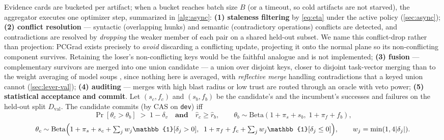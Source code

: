 \documentclass{article}
\newcommand{\code}[1]{\texttt{#1}}
\newcommand{\Dval}{D_{\mathrm{val}}}
\begin{document}
Evidence cards are bucketed per artifact; when a bucket reaches batch size $B$ (or a timeout, so cold artifacts are not starved), the aggregator executes one optimizer step, summarized in \cref{alg:async}: \textbf{(1) staleness filtering} by \cref{eq:eta} under the active policy (\cref{sec:async}); \textbf{(2) conflict resolution} --- syntactic (overlapping hunks) and semantic (contradictory operations) conflicts are detected, and contradictions are resolved by \emph{dropping} the weaker member of each pair on a shared held-out subset. We name this conflict-drop rather than projection: PCGrad \citep{yu2020pcgrad} exists precisely to \emph{avoid} discarding a conflicting update, projecting it onto the normal plane so its non-conflicting component survives. Retaining the loser's non-conflicting keys would be the faithful analogue and is not implemented; \textbf{(3) fusion} --- complementary survivors are merged into one union candidate --- a union over disjoint keys, closer to disjoint task-vector merging than to the weight averaging of model soups \citep{wortsman2022modelsoups}, since nothing here is averaged, with \emph{reflective merge} handling contradictions that a keyed union cannot (\cref{sec:lever-val}); \textbf{(4) auditing} --- merges with high blast radius or low trust are routed through an oracle with veto power; \textbf{(5) statistical acceptance and commit}. Let $(s_c, f_c)$ and $(s_b, f_b)$ be the candidate's and the incumbent's successes and failures on the held-out split $\Dval$. The candidate commits (by CAS on \code{dev}) iff
\begin{equation}
\label{eq:accept}
\Pr\!\left[\theta_c > \theta_b\right] \;>\; 1 - \delta_v
\quad\textbf{and}\quad \hat r_c \ge \hat r_b,
\qquad
\theta_b \sim \mathrm{Beta}(1 + \pi_s + s_b,\; 1 + \pi_f + f_b),
\end{equation}
\begin{equation}
\label{eq:acceptcand}
\theta_c \sim \mathrm{Beta}\Bigl(1 + \pi_s + s_c + \textstyle\sum_j w_j \mathbb{1}[\delta_j > 0],\;\;
                                 1 + \pi_f + f_c + \textstyle\sum_j w_j \mathbb{1}[\delta_j \le 0]\Bigr),
\qquad w_j = \min(1, 4|\delta_j|).
\end{equation}
\end{document}

